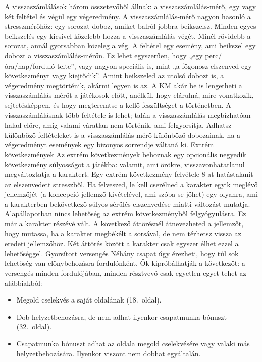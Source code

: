 \documentclass[oneside]{book}
\newcommand{\page}[1]{#1.~oldal}
\begin{document}
A visszaszámlálások három összetevőből állnak: a visszaszámlálás‑mérő, egy vagy két feltétel és végül egy végeredmény.
A visszaszámlálás‑mérő nagyon hasonló a stresszmérőhöz: egy sorozat doboz, amiket balról jobbra beikszelsz. Minden egyes beikszelés egy kicsivel közelebb hozza a visszaszámlálás végét. Minél rövidebb a sorozat, annál gyorsabban közeleg a vég.
A feltétel egy esemény, ami beikszel egy dobozt a visszaszámlálás‑mérőn. Ez lehet egyszerűen, hogy „egy perc/óra/nap/forduló telte”, vagy nagyon speciális is, mint „a főgonosz elszenved egy következményt vagy kiejtődik”.
Amint beikszeled az utolsó dobozt is, a végeredmény megtörténik, akármi legyen is az.
A KM akár be is lengetheti a visszaszámlálás‑mérőt a játékosok előtt, anélkül, hogy elárulná, mire vonatkozik, sejtetésképpen, és hogy megteremtse a kellő feszültséget a történetben.
A visszaszámlálásnak több feltétele is lehet; talán a visszaszámlálás megbízhatóan halad előre, amíg valami váratlan nem történik, ami felgyorsítja. Adhatsz különböző feltételeket is a visszaszámlálás‑mérő különböző dobozainak, ha a végeredményt események egy bizonyos sorrendje váltaná ki.
Extrém következmények
Az extrém következmények behoznak egy opcionális negyedik következmény súlyosságot a játékba: valamit, ami örökre, visszavonhatatlanul megváltoztatja a karaktert.
Egy extrém következmény felvétele 8‑at hatástalanít az elszenvedett stresszből. Ha felveszed, le kell cserélned a karakter egyik meglévő jellemzőjét (a koncepció jellemző kivételével, ami szóba se jöhet) egy olyanra, ami a karakterben bekövetkező súlyos sérülés elszenvedése miatti változást mutatja.
Alapállapotban nincs lehetőség az extrém következményből felgyógyulásra. Ez már a karakter részévé vált. A következő áttörésnél átnevezheted a jellemzőt, hogy mutassa, ha a karakter megbékélt a sorsával, de nem térhetsz vissza az eredeti jellemzőhöz.
Két áttörés között a karakter csak egyszer élhet ezzel a lehetőséggel.
Gyorsított versengés
Néhány csapat úgy érezheti, hogy túl sok lehetőség van előnybehozásra fordulónként. Ők kipróbálhatják a következőt: a versengés minden fordulójában, minden résztvevő csak egyetlen egyet tehet az alábbiakból:

\begin{itemize}
    \item Megold cselekvés a saját oldalának (\page{18}).
    \item Dob helyzetbehozásra, de nem adhat ilyenkor csapatmunka bónuszt (\page{32}).
    \item Csapatmunka bónuszt adhat az oldala megold cselekvésére vagy valaki más helyzetbehozására. Ilyenkor viszont nem dobhat egyáltalán.
\end{itemize}
\end{document}
